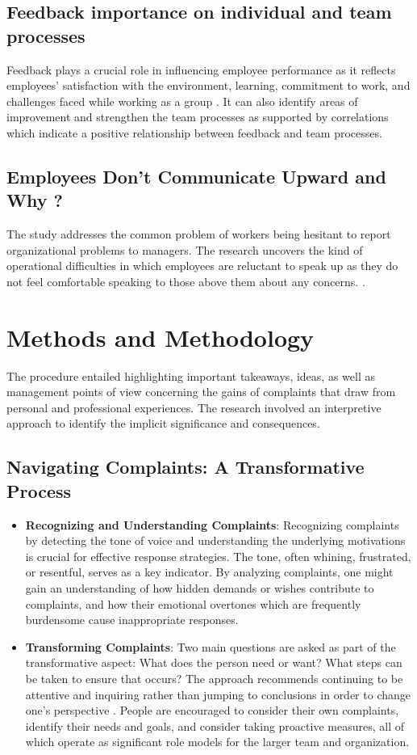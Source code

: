 \documentclass[a4paper,12pt]{article}
\begin{document}
\subsection{Feedback importance on individual and team processes}
Feedback plays a crucial role in influencing employee performance as it reflects employees' satisfaction with the environment, learning, commitment to work, and challenges faced while working as a group \cite{feedback_importance}. It can also identify areas of improvement and strengthen the team processes as supported by correlations which indicate a positive relationship between feedback and team processes. 
\subsection{Employees Don’t Communicate Upward and Why ?}
The study addresses the common problem of workers being hesitant to report organizational problems to managers. The research uncovers the kind of operational difficulties in which employees are reluctant to speak up as they do not feel comfortable speaking to those above them about any concerns. \cite{employee_silence}. 
\newpage
\section{Methods and Methodology}
The procedure entailed highlighting important takeaways, ideas, as well as management points of view concerning the gains of complaints that draw from personal and professional experiences. The research involved an interpretive approach to identify the implicit significance and consequences.

\subsection{Navigating Complaints: A Transformative Process }
\begin{itemize}
    \item \textbf{Recognizing and Understanding Complaints}: Recognizing complaints by detecting the tone of voice and understanding the underlying motivations is crucial for effective response strategies.  The tone, often whining, frustrated, or resentful, serves as a key indicator\cite{complaint_to_opportunities}.  By analyzing complaints, one might gain an understanding of how hidden demands or wishes contribute to complaints, and how their emotional overtones which are frequently burdensome cause inappropriate responses.
    \item \textbf{Transforming Complaints}: Two main questions are asked as part of the transformative aspect: What does the person need or want? What steps can be taken to ensure that occurs? The approach recommends continuing to be attentive and inquiring rather than jumping to conclusions in order to change one's perspective \cite{complaint_to_opportunities}. People are encouraged to consider their own complaints, identify their needs and goals, and consider taking proactive measures, all of which operate as significant role models for the larger team and organization.
\end{itemize}
\end{document}
